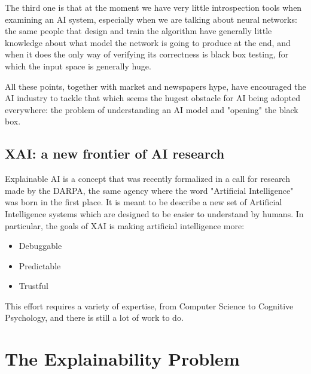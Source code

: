 \documentclass{article}
\newcommand{\note}{\todo[tickmarkheight=0.2cm]}
\begin{document}
The third one is that at the moment we have very little introspection tools when examining an AI system, especially when we are talking about neural networks: the same people that design and train the algorithm have generally little knowledge about what model the network is going to produce at the end, and when it does the only way of verifying its correctness is black box testing, for which the input space is generally huge.

All these points, together with market and newspapers hype, have encouraged the AI industry to tackle that which seems the hugest obstacle for AI being adopted everywhere: the problem of understanding an AI model and "opening" the black box.

\subsection{XAI: a new frontier of AI research}

Explainable AI is a concept that was recently formalized in a call for
research \note{cit} made by the DARPA, the same agency where the word "Artificial
Intelligence" was born in the first place. It is meant to be describe a new set
of Artificial Intelligence systems which are designed to be easier to understand
by humans. In particular, the goals of XAI is making artificial intelligence
more:

\begin{itemize}
    \item Debuggable
    \item Predictable
    \item Trustful
\end{itemize}


This effort requires a variety of expertise, from Computer Science to Cognitive Psychology, and there is still a lot of work to do.


\section{The Explainability Problem}
\end{document}
